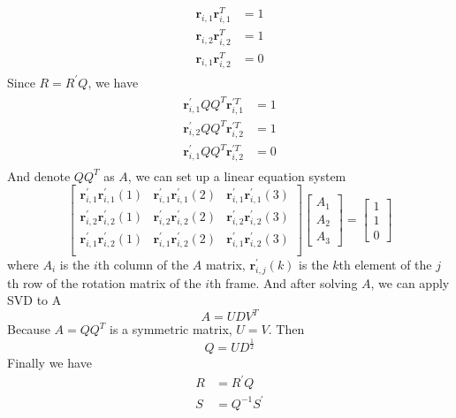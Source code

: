 \documentclass{article}
\begin{document}
\begin{align}
\begin{split}
\boldsymbol{r}_{i,1}\boldsymbol{r}_{i,1}^T&=1\\
\boldsymbol{r}_{i,2}\boldsymbol{r}_{i,2}^T&=1\\
\boldsymbol{r}_{i,1}\boldsymbol{r}_{i,2}^T&=0
\end{split}
\end{align}
Since $R=R^{'}Q$, we have
\begin{align}
\begin{split}
\boldsymbol{r}^{'}_{i,1}QQ^T\boldsymbol{r}^{'T}_{i,1}&=1\\
\boldsymbol{r}^{'}_{i,2}QQ^T\boldsymbol{r}^{'T}_{i,2}&=1\\
\boldsymbol{r}^{'}_{i,1}QQ^T\boldsymbol{r}^{'T}_{i,2}&=0
\end{split}
\end{align}
And denote $QQ^T$ as $A$, we can set up a linear equation system
\begin{equation}
\begin{bmatrix}
\boldsymbol{r}^{'}_{i,1}\boldsymbol{r}^{'}_{i,1}(1)&\boldsymbol{r}^{'}_{i,1}\boldsymbol{r}^{'}_{i,1}(2)&\boldsymbol{r}^{'}_{i,1}\boldsymbol{r}^{'}_{i,1}(3)\\
\boldsymbol{r}^{'}_{i,2}\boldsymbol{r}^{'}_{i,2}(1)&\boldsymbol{r}^{'}_{i,2}\boldsymbol{r}^{'}_{i,2}(2)&\boldsymbol{r}^{'}_{i,2}\boldsymbol{r}^{'}_{i,2}(3)\\
\boldsymbol{r}^{'}_{i,1}\boldsymbol{r}^{'}_{i,2}(1)&\boldsymbol{r}^{'}_{i,1}\boldsymbol{r}^{'}_{i,2}(2)&\boldsymbol{r}^{'}_{i,1}\boldsymbol{r}^{'}_{i,2}(3)\\
\end{bmatrix}\begin{bmatrix}A_1\\A_2\\A_3\end{bmatrix}=\begin{bmatrix}1\\1\\0\end{bmatrix}
\end{equation}
where $A_i$ is the $i$th column of the $A$ matrix, $\boldsymbol{r}^{'}_{i,j}(k)$ is the $k$th element of the $j$th row of the rotation matrix of the $i$th frame. And after solving $A$, we can apply SVD to A
\begin{equation}
A=UDV^T
\end{equation}
Because $A=QQ^T$ is a symmetric matrix, $U=V$. Then 
\begin{equation}
Q = UD^{\frac{1}{2}}
\end{equation}
Finally we have
\begin{align}
R &= R^{'}Q\\
S &= Q^{-1}S^{'}
\end{align}
\end{document}
